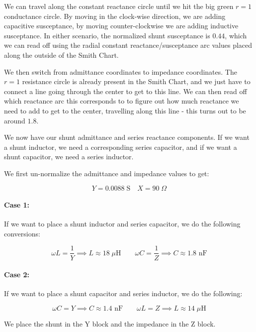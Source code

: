 \documentclass{article}
\begin{document}
We can travel along the constant reactance circle until we hit the big green $r = 1$ conductance circle. By moving in the clock-wise direction, we are adding capacitive susceptance, by moving counter-clockwise we are adding inductive susceptance. In either scenario, the normalized shunt susceptance is $0.44$, which we can read off using the radial constant reactance/susceptance arc values placed along the outside of the Smith Chart.

\newpage

We then switch from admittance coordinates to impedance coordinates. The $r = 1$ resistance circle is already present in the Smith Chart, and we just have to connect a line going through the center to get to this line. We can then read off which reactance arc this corresponds to to figure out how much reactance we need to add to get to the center, travelling along this line - this turns out to be around $1.8$. 



We now have our shunt admittance and series reactance components. If we want a shunt inductor, we need a corresponding series capacitor, and if we want a shunt capacitor, we need a series inductor. 
\vspace{3mm}

We first un-normalize the admittance and impedance values to get:

\[
Y = 0.0088 \;\text{S} \quad X = 90 \;\Omega
\]

\paragraph{Case 1:} 

If we want to place a shunt inductor and series capacitor, we do the following conversions:

\[
\omega L = \frac{1}{Y} \implies L \approx 18 \;\mu\text{H} \qquad
\omega C = \frac{1}{Z} \implies C \approx 1.8 \text{ nF}
\]

\paragraph{Case 2:}

If we want to place a shunt capacitor and series inductor, we do the following:

\[
\omega C = Y \implies C \approx 1.4 \text{ nF}\qquad
\omega L = Z \implies L \approx 14 \;\mu\text{H} 
\]

We place the shunt in the Y block and the impedance in the Z block. 
\vspace{3mm}
\end{document}
